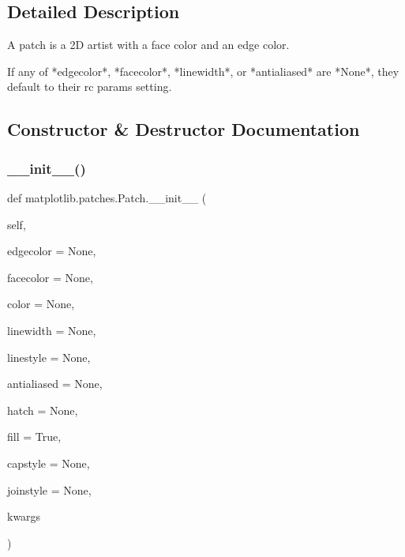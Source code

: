 \subsection{Detailed Description}
\begin{DoxyVerb}A patch is a 2D artist with a face color and an edge color.

If any of *edgecolor*, *facecolor*, *linewidth*, or *antialiased*
are *None*, they default to their rc params setting.
\end{DoxyVerb}
 

\subsection{Constructor \& Destructor Documentation}
\mbox{\label{classmatplotlib_1_1patches_1_1Patch_a38e59a65cd560eae8171f2c8e9a73fc3}} 
\subsubsection{\texorpdfstring{\+\_\+\+\_\+init\+\_\+\+\_\+()}{\_\_init\_\_()}}
{\footnotesize\ttfamily def matplotlib.\+patches.\+Patch.\+\_\+\+\_\+init\+\_\+\+\_\+ (\begin{DoxyParamCaption}\item[{}]{self,  }\item[{}]{edgecolor = {\ttfamily None},  }\item[{}]{facecolor = {\ttfamily None},  }\item[{}]{color = {\ttfamily None},  }\item[{}]{linewidth = {\ttfamily None},  }\item[{}]{linestyle = {\ttfamily None},  }\item[{}]{antialiased = {\ttfamily None},  }\item[{}]{hatch = {\ttfamily None},  }\item[{}]{fill = {\ttfamily True},  }\item[{}]{capstyle = {\ttfamily None},  }\item[{}]{joinstyle = {\ttfamily None},  }\item[{}]{kwargs }\end{DoxyParamCaption})}

